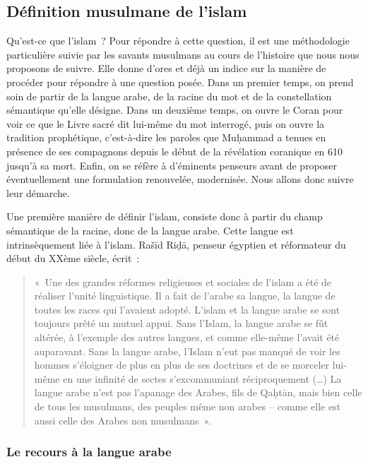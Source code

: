 \subsection{Définition musulmane de l'islam
}
\label{duxe9finition-musulmane-de-lislam}

Qu'est-ce que l'islam~? Pour répondre à cette question, il est une
méthodologie particulière suivie par les savants musulmans au cours de
l'histoire que nous nous proposons de suivre. Elle donne d'ores et déjà
un indice sur la manière de procéder pour répondre à une question posée.
Dans un premier temps, on prend soin de partir de la langue arabe, de la
racine du mot et de la constellation sémantique qu'elle désigne. Dans un
deuxième temps, on ouvre le Coran pour voir ce que le Livre sacré dit
lui-même du mot interrogé, puis on ouvre la tradition prophétique,
c'est-à-dire les paroles que Muḥammad a tenues en présence de ses
compagnons depuis le début de la révélation coranique en 610 jusqu'à sa
mort. Enfin, on se réfère à d'éminents penseurs avant de proposer
éventuellement une formulation renouvelée, modernisée. Nous allons donc
suivre leur démarche.

Une première manière de définir l'islam, consiste donc à partir du champ
sémantique de la racine, donc de la langue arabe. Cette langue est
intrinsèquement liée à l'islam. Rašīd Riḍā, penseur égyptien et
réformateur du début du XXème siècle, écrit~:

\begin{quote}
«~Une des grandes réformes religieuses et sociales de l'islam a été de
réaliser l'unité linguistique. Il a fait de l'arabe sa langue, la langue
de toutes les races qui l'avaient adopté. L'islam et la langue arabe se
sont toujours prêté un mutuel appui. Sans l'Islam, la langue arabe se
fût altérée, à l'exemple des autres langues, et comme elle-même l'avait
été auparavant. Sans la langue arabe, l'Islam n'eut pas manqué de voir
les hommes s'éloigner de plus en plus de ses doctrines et de se morceler
lui-même en une infinité de sectes s'excommuniant réciproquement
(\ldots) La langue arabe n'est pas l'apanage des Arabes, fils de Qaḥtān,
mais bien celle de tous les musulmans, des peuples même non arabes --
comme elle est aussi celle des Arabes non musulmans~».
\end{quote}

\subsubsection{ Le recours à la langue arabe} 

